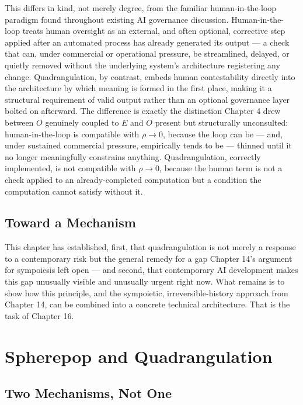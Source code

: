 \documentclass[12pt,a4paper]{book}
\begin{document}
This differs in kind, not merely degree, from the familiar human-in-the-loop paradigm found throughout existing AI governance discussion. Human-in-the-loop treats human oversight as an external, and often optional, corrective step applied after an automated process has already generated its output — a check that can, under commercial or operational pressure, be streamlined, delayed, or quietly removed without the underlying system's architecture registering any change. Quadrangulation, by contrast, embeds human contestability directly into the architecture by which meaning is formed in the first place, making it a structural requirement of valid output rather than an optional governance layer bolted on afterward. The difference is exactly the distinction Chapter 4 drew between $O$ genuinely coupled to $E$ and $O$ present but structurally unconsulted: human-in-the-loop is compatible with $\rho \to 0$, because the loop can be — and, under sustained commercial pressure, empirically tends to be — thinned until it no longer meaningfully constrains anything. Quadrangulation, correctly implemented, is not compatible with $\rho \to 0$, because the human term is not a check applied to an already-completed computation but a condition the computation cannot satisfy without it.

\section{Toward a Mechanism}

This chapter has established, first, that quadrangulation is not merely a response to a contemporary risk but the general remedy for a gap Chapter 14's argument for sympoiesis left open — and second, that contemporary AI development makes this gap unusually visible and unusually urgent right now. What remains is to show how this principle, and the sympoietic, irreversible-history approach from Chapter 14, can be combined into a concrete technical architecture. That is the task of Chapter 16.


\chapter{Spherepop and Quadrangulation}

\section{Two Mechanisms, Not One}
\end{document}
